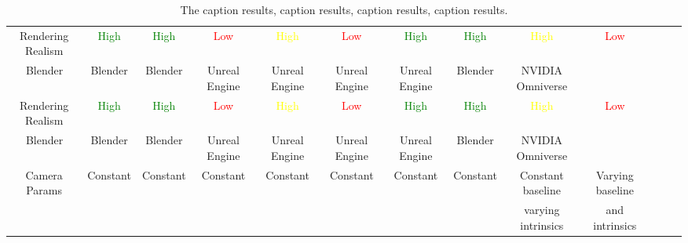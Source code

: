 \documentclass[letterpaper]{article} %
\begin{document}
\begin{table}[ht!]
{\begin{tabular}{clcc ccc ccc ccc c}
\multicolumn{2}{c}{Rendering Realism}&\textcolor{green}{High}&\textcolor{green}{High}&\textcolor{red}{Low}&\textcolor{Yellow}{High}&\textcolor{red}{Low}&\textcolor{green}{High}&\textcolor{green}{High}&\textcolor{Yellow}{High}&\textcolor{red}{Low}\\
\rowcolor{gray!20}\multicolumn{2}{c}{Simulator}&Blender&Blender&Blender&Unreal Engine&Unreal Engine&Unreal Engine&Unreal Engine&Blender&NVIDIA Omniverse\\
\multicolumn{2}{c}{Rendering Realism}&\textcolor{green}{High}&\textcolor{green}{High}&\textcolor{red}{Low}&\textcolor{Yellow}{High}&\textcolor{red}{Low}&\textcolor{green}{High}&\textcolor{green}{High}&\textcolor{Yellow}{High}&\textcolor{red}{Low}\\
\rowcolor{gray!20}\multicolumn{2}{c}{Simulator}&Blender&Blender&Blender&Unreal Engine&Unreal Engine&Unreal Engine&Unreal Engine&Blender&NVIDIA Omniverse\\
\multicolumn{2}{c}{\multirow{2}{*}{Camera Params}}&\multirow{2}{*}{Constant}&\multirow{2}{*}{Constant}&\multirow{2}{*}{Constant}&\multirow{2}{*}{Constant}&\multirow{2}{*}{Constant}&\multirow{2}{*}{Constant}&\multirow{2}{*}{Constant}&Constant baseline&Varying baseline\\
&&&&&&&&&varying intrinsics&and intrinsics\\
             \bottomrule
       \end{tabular}
   }
   \caption{The caption results, caption results, caption results, caption results.}
\end{table}
\end{document}

